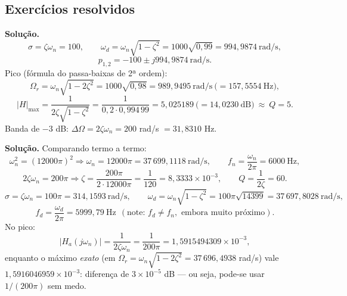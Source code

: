 \subsection*{Exercícios resolvidos}


\textbf{Solução.}
\[
  \sigma=\zeta\omega_n=100,\qquad
  \omega_d=\omega_n\sqrt{1-\zeta^2}=1000\sqrt{0{,}99}=994{,}9874\ \text{rad/s},
\]
\[
  p_{1,2}=-100\pm j994{,}9874\ \text{rad/s}.
\]
Pico (fórmula do passa-baixas de 2ª ordem):
\[
  \Omega_r=\omega_n\sqrt{1-2\zeta^2}=1000\sqrt{0{,}98}=989{,}9495\ \text{rad/s}
  \ \bigl(=157{,}5554\ \text{Hz}\bigr),
\]
\[
  |H|_{\max}=\frac{1}{2\zeta\sqrt{1-\zeta^2}}
  =\frac{1}{0{,}2\cdot0{,}994\,99}=5{,}025189
  \ \bigl(=14{,}0230\ \text{dB}\bigr)\ \approx\ Q=5 .
\]
Banda de $-3$ dB: $\Delta\Omega=2\zeta\omega_n=200$ rad/s
$=31{,}8310$ Hz.



\textbf{Solução.} Comparando termo a termo:
\[
  \omega_n^2=(12000\pi)^2\Rightarrow\omega_n=12000\pi=37\,699{,}1118\ \text{rad/s},
  \qquad f_n=\frac{\omega_n}{2\pi}=6000\ \text{Hz},
\]
\[
  2\zeta\omega_n=200\pi\Rightarrow \zeta=\frac{200\pi}{2\cdot12000\pi}
  =\frac{1}{120}=8{,}3333\times10^{-3},\qquad Q=\frac{1}{2\zeta}=60 .
\]
\[
  \sigma=\zeta\omega_n=100\pi=314{,}1593\ \text{rad/s},\qquad
  \omega_d=\omega_n\sqrt{1-\zeta^2}=100\pi\sqrt{14399}=37\,697{,}8028\ \text{rad/s},
\]
\[
  f_d=\frac{\omega_d}{2\pi}=5999{,}79\ \text{Hz}
  \ \ (\text{note: }f_d\neq f_n,\text{ embora muito próximo}).
\]
No pico:
\[
  |H_a(j\omega_n)|=\frac{1}{2\zeta\omega_n}=\frac{1}{200\pi}
  =1{,}5915494309\times10^{-3},
\]
enquanto o máximo \emph{exato} (em $\Omega_r=\omega_n\sqrt{1-2\zeta^2}
=37\,696{,}4938$ rad/s) vale $1{,}5916046959\times10^{-3}$: diferença de
$3\times10^{-5}$ dB — ou seja, pode-se usar $1/(200\pi)$ sem medo.


